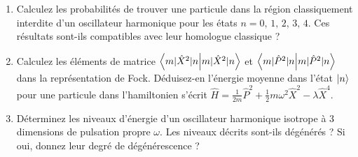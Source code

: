 \begin{enumerate}
\item Calculez les probabilités de trouver une particule dans la région classiquement interdite d'un oscillateur harmonique pour les états $n = 0, \, 1, \, 2, \, 3, \, 4$. Ces résultats sont-ils compatibles avec leur homologue classique ?

\item Calculez les éléments de matrice $\braket{m|\hat X^2|n}$ et $\braket{m|\hat P^2|n}$ dans la représentation de Fock. Déduisez-en l'énergie moyenne dans l'état $\ket{n}$ pour une particule dans l'hamiltonien s'écrit $\hat H = \frac{1}{2m}\hat P^2 + \frac{1}{2}m\omega^2 \hat X^2 - \lambda \hat X^4$. 

\item Déterminez les niveaux d'énergie d'un oscillateur harmonique isotrope à 3 dimensions de pulsation propre $\omega$. Les niveaux décrits sont-ils dégénérés ? Si oui, donnez leur degré de dégénérescence ? 

\end{enumerate}

